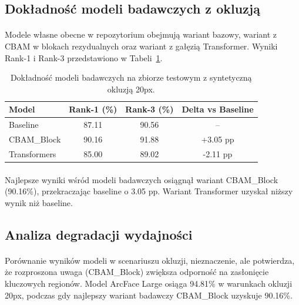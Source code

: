 \subsection{Dokładność modeli badawczych z okluzją}

\paragraph{}Modele własne obecne w repozytorium obejmują wariant bazowy, wariant z CBAM w blokach rezydualnych oraz wariant z gałęzią Transformer. Wyniki Rank-1 i Rank-3 przedstawiono w Tabeli~\ref{tab:results_custom}.

\begin{table}[H]
\centering
\small
\begin{tabular}{lccc}
\toprule
\textbf{Model} & \textbf{Rank-1 (\%)} & \textbf{Rank-3 (\%)} & \textbf{Delta vs Baseline} \\
\midrule
Baseline & 87.11 & 90.56 & -- \\
CBAM\_Block & 90.16 & 91.88 & +3.05 pp \\
Transformers & 85.00 & 89.02 & -2.11 pp \\
\bottomrule
\end{tabular}
\caption{Dokładność modeli badawczych na zbiorze testowym z syntetyczną okluzją 20px.}
\label{tab:results_custom}
\end{table}

\paragraph{}Najlepsze wyniki wśród modeli badawczych osiągnął wariant CBAM\_Block (90.16\%), przekraczając baseline o 3.05 pp. Wariant Transformer uzyskał niższy wynik niż baseline.

\subsection{Analiza degradacji wydajności}

\paragraph{}Porównanie wyników modeli w scenariuszu okluzji, nieznaczenie, ale potwierdza, że rozproszona uwaga (CBAM\_Block) zwiększa odporność na zasłonięcie kluczowych regionów. Model ArcFace Large osiąga 94.81\% w warunkach okluzji 20px, podczas gdy najlepszy wariant badawczy CBAM\_Block uzyskuje 90.16\%.

